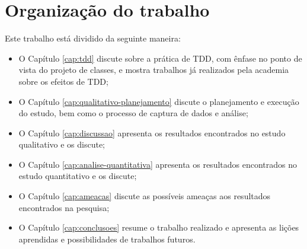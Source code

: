 \section{Organização do trabalho}

Este trabalho está dividido da seguinte maneira: 

\begin{itemize}
	\item O Capítulo \ref{cap:tdd} discute sobre a prática de TDD, com ênfase no
	ponto de vista do projeto de classes, e mostra trabalhos já
	realizados pela academia sobre os efeitos de TDD;

	\item O Capítulo \ref{cap:qualitativo-planejamento} discute o planejamento e execução do estudo,
	bem como o processo de captura de dados e análise;

	\item O Capítulo \ref{cap:discussao} apresenta os resultados encontrados no estudo qualitativo 
	e os discute;
	
	\item O Capítulo \ref{cap:analise-quantitativa} apresenta os resultados encontrados no 
	estudo quantitativo e os discute;	
	
	\item O Capítulo \ref{cap:ameacas} discute as possíveis ameaças aos resultados
	encontrados na pesquisa;
	
	\item O Capítulo \ref{cap:conclusoes} resume o trabalho realizado e apresenta
	as lições aprendidas e possibilidades de trabalhos futuros.
\end{itemize}

